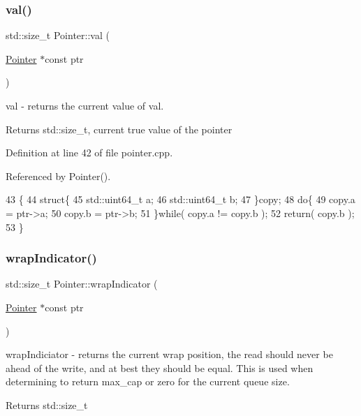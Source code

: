 \subsubsection{\texorpdfstring{val()}{val()}}
{\footnotesize\ttfamily std\+::size\+\_\+t Pointer\+::val (\begin{DoxyParamCaption}\item[{\hyperlink{class_pointer}{Pointer} $\ast$const}]{ptr }\end{DoxyParamCaption})\hspace{0.3cm}{\ttfamily [static]}}

val -\/ returns the current value of val. \begin{DoxyReturn}{Returns}
std\+::size\+\_\+t, current \textquotesingle{}true\textquotesingle{} value of the pointer 
\end{DoxyReturn}


Definition at line 42 of file pointer.\+cpp.



Referenced by Pointer().


\begin{DoxyCode}
43 \{
44    \textcolor{keyword}{struct}\{
45       std::uint64\_t a;
46       std::uint64\_t b;
47    \}copy;
48    \textcolor{keywordflow}{do}\{
49       copy.a = ptr->a;
50       copy.b = ptr->b;
51    \}\textcolor{keywordflow}{while}( copy.a !=  copy.b );
52    \textcolor{keywordflow}{return}( copy.b );
53 \}
\end{DoxyCode}
\hypertarget{class_pointer_a47f973d7d52da42d4089e576ed8584de}{}\label{class_pointer_a47f973d7d52da42d4089e576ed8584de} 
\subsubsection{\texorpdfstring{wrap\+Indicator()}{wrapIndicator()}}
{\footnotesize\ttfamily std\+::size\+\_\+t Pointer\+::wrap\+Indicator (\begin{DoxyParamCaption}\item[{\hyperlink{class_pointer}{Pointer} $\ast$const}]{ptr }\end{DoxyParamCaption})\hspace{0.3cm}{\ttfamily [static]}}

wrap\+Indiciator -\/ returns the current wrap position, the read should never be ahead of the write, and at best they should be equal. This is used when determining to return max\+\_\+cap or zero for the current queue size. \begin{DoxyReturn}{Returns}
std\+::size\+\_\+t 
\end{DoxyReturn}


